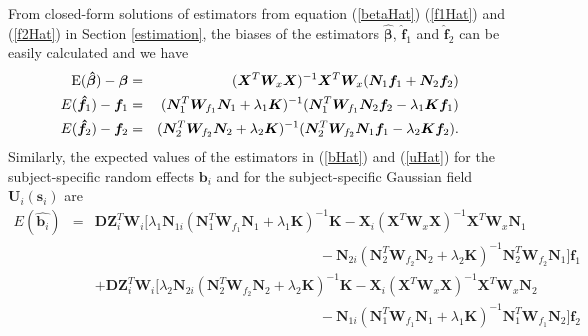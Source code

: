 \documentclass[article,lineno]{biometrika}
\begin{document}
From closed-form solutions of estimators from equation (\ref{betaHat}) (\ref{f1Hat}) and (\ref{f2Hat}) in  Section \ref{estimation}, the biases of the estimators $\boldsymbol {\hat \beta}$, $\boldsymbol {\hat f}_1$ and 
$\boldsymbol {\hat f}_2$ can be easily calculated and we have
\begin{eqnarray}
{\rm E}(\boldsymbol {\hat \beta})  -  \boldsymbol \beta
&=& \label{biasBeta}
 (\boldsymbol X^T  \boldsymbol W_x \boldsymbol X )^{-1} \boldsymbol X^T  \boldsymbol W_x  (\boldsymbol N_1 \boldsymbol f_1
 +
  \boldsymbol N_2 \boldsymbol f_2) \\
E(\boldsymbol {\hat f}_1) - \boldsymbol f_1  
&=& \label{biasF1}
(\boldsymbol N_1^T \boldsymbol W_{f_1}  \boldsymbol N_1 
+ \lambda_1 \boldsymbol K)^{-1}  
  ( \boldsymbol N_1^T \boldsymbol W_{f_1}
  \boldsymbol N_2 \boldsymbol f_2 - \lambda_1    \boldsymbol K \boldsymbol f_1) \\
E(\boldsymbol {\hat f}_2) - \boldsymbol f_2  
&=&  \label{biasF2}
(\boldsymbol N_2^T \boldsymbol W_{f_2}  \boldsymbol N_2 
+ \lambda_2 \boldsymbol K)^{-1}  
 (\boldsymbol N_2^T \boldsymbol W_{f_2} \boldsymbol N_1 \boldsymbol f_1 
  -  \lambda_2    \boldsymbol K \boldsymbol f_2).
\end{eqnarray}
Similarly,  the expected values of the estimators in (\ref{bHat}) and (\ref{uHat}) for the subject-specific random effects $\boldsymbol b_i$ and for the subject-specific Gaussian field $\boldsymbol U_i(\boldsymbol s_i)$
 are 
\begin{eqnarray*}
E(\hat {\boldsymbol b_i}) 
&=& 
\boldsymbol D \boldsymbol Z_i^T \boldsymbol W_i 
[
\lambda_1 \boldsymbol N_{1i}
 (\boldsymbol N_1^T \boldsymbol W_{f_1}  \boldsymbol N_1 + \lambda_1 \boldsymbol K)^{-1}  
\boldsymbol K
-  
\boldsymbol X_i(\boldsymbol X^T  \boldsymbol W_x \boldsymbol X )^{-1} \boldsymbol X^T  \boldsymbol W_x  \boldsymbol N_1
\\
&& 
\quad\quad\quad\quad \quad \quad \quad \quad \quad \quad \quad \quad \quad \quad\quad \quad
-
 \boldsymbol N_{2i}
(\boldsymbol N_2^T \boldsymbol W_{f_2}  \boldsymbol N_2 + \lambda_2 \boldsymbol K)^{-1}  \boldsymbol N_2^T \boldsymbol W_{f_2} 
\boldsymbol N_{1} 
 ]
  \boldsymbol f_1  
\\
&& 
+
\boldsymbol D \boldsymbol Z_i^T \boldsymbol W_i 
[
\lambda_2 \boldsymbol N_{2i}
(\boldsymbol N_2^T \boldsymbol W_{f_2}  \boldsymbol N_2 + \lambda_2 \boldsymbol K)^{-1}
  \boldsymbol K
-  
\boldsymbol X_i(\boldsymbol X^T  \boldsymbol W_x \boldsymbol X )^{-1} \boldsymbol X^T  \boldsymbol W_x  \boldsymbol N_2
\\
&& 
\quad\quad\quad\quad \quad \quad \quad \quad \quad \quad \quad \quad \quad \quad\quad \quad
-
 \boldsymbol N_{1i}
 (\boldsymbol N_1^T \boldsymbol W_{f_1}  \boldsymbol N_1 + \lambda_1 \boldsymbol K)^{-1}  
\boldsymbol N_1^T \boldsymbol W_{f_1}
\boldsymbol N_2
 ]
  \boldsymbol f_2 \\
  \end{eqnarray*}
\end{document}
